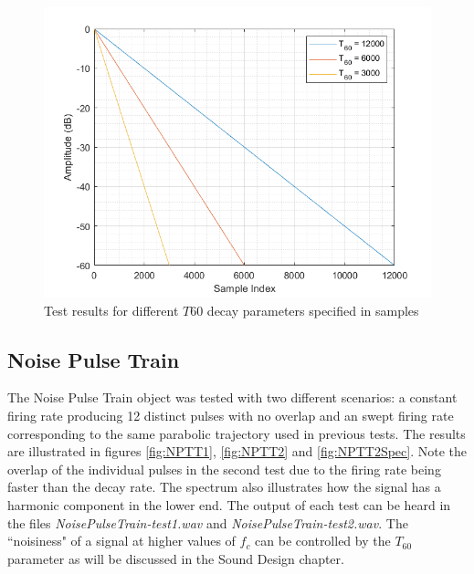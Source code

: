 \documentclass[../main.tex]{subfiles}
\begin{document}
\begin{figure}[h]
    \centering
    \includegraphics[scale=.65]{./images/plots/ExpDecayTest1.png}
    \caption{Test results for different $T60$ decay parameters specified in samples}
    \label{fig:ExpDecayTest1}
\end{figure}

\clearpage
 
\subsection{Noise Pulse Train}
The Noise Pulse Train object was tested with two different scenarios: a constant firing rate producing 12 distinct pulses with no overlap and an swept firing rate corresponding to the same parabolic trajectory used in previous tests. The results are illustrated in figures \ref{fig:NPTT1}, \ref{fig:NPTT2} and \ref{fig:NPTT2Spec}. Note the overlap of the individual pulses in the second test due to the firing rate being faster than the decay rate. The spectrum also illustrates how the signal has a harmonic component in the lower end. The output of each test can be heard in the files \emph{NoisePulseTrain-test1.wav} and \emph{NoisePulseTrain-test2.wav}. The ``noisiness" of a signal at higher values of $f_c$ can be controlled by the $T_{60}$ parameter as will be discussed in the Sound Design chapter.
\end{document}
